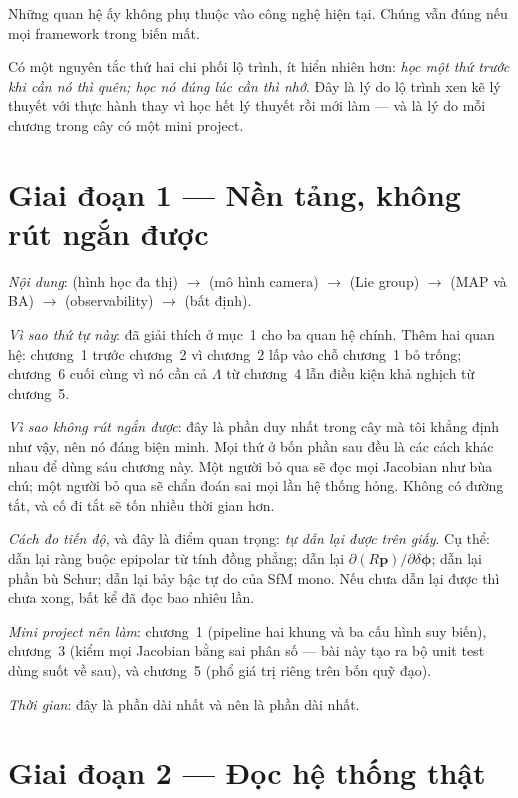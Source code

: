 \documentclass[../../vslam.tex]{subfiles}
\begin{document}
Những quan hệ ấy không phụ thuộc vào công nghệ hiện tại. Chúng vẫn đúng nếu mọi framework trong  biến mất.

Có một nguyên tắc thứ hai chi phối lộ trình, ít hiển nhiên hơn: \emph{học một thứ trước khi cần nó thì quên; học nó đúng lúc cần thì nhớ}. Đây là lý do lộ trình xen kẽ lý thuyết với thực hành thay vì học hết lý thuyết rồi mới làm --- và là lý do mỗi chương trong cây có một mini project.

\section{Giai đoạn 1 --- Nền tảng, không rút ngắn được}

\emph{Nội dung}:  (hình học đa thị) \(\rightarrow\)  (mô hình camera) \(\rightarrow\)  (Lie group) \(\rightarrow\)  (MAP và BA) \(\rightarrow\)  (observability) \(\rightarrow\)  (bất định).

\emph{Vì sao thứ tự này}: đã giải thích ở mục~1 cho ba quan hệ chính. Thêm hai quan hệ: chương~1 trước chương~2 vì chương~2 lấp vào chỗ chương~1 bỏ trống; chương~6 cuối cùng vì nó cần cả \(\Lambda\) từ chương~4 lẫn điều kiện khả nghịch từ chương~5.

\emph{Vì sao không rút ngắn được}: đây là phần duy nhất trong cây mà tôi khẳng định như vậy, nên nó đáng biện minh. Mọi thứ ở bốn phần sau đều là các cách khác nhau để dùng sáu chương này. Một người bỏ qua  sẽ đọc mọi Jacobian như bùa chú; một người bỏ qua  sẽ chẩn đoán sai mọi lần hệ thống hỏng. Không có đường tắt, và cố đi tắt sẽ tốn nhiều thời gian hơn.

\emph{Cách đo tiến độ}, và đây là điểm quan trọng: \emph{tự dẫn lại được trên giấy}. Cụ thể: dẫn lại ràng buộc epipolar từ tính đồng phẳng; dẫn lại \(\partial(R\mathbf{p})/\partial\delta\boldsymbol{\phi}\); dẫn lại phần bù Schur; dẫn lại bảy bậc tự do của SfM mono. Nếu chưa dẫn lại được thì chưa xong, bất kể đã đọc bao nhiêu lần.

\emph{Mini project nên làm}: chương~1 (pipeline hai khung và ba cấu hình suy biến), chương~3 (kiểm mọi Jacobian bằng sai phân số --- bài này tạo ra bộ unit test dùng suốt về sau), và chương~5 (phổ giá trị riêng trên bốn quỹ đạo).

\emph{Thời gian}: đây là phần dài nhất và nên là phần dài nhất.

\section{Giai đoạn 2 --- Đọc hệ thống thật}
\end{document}
